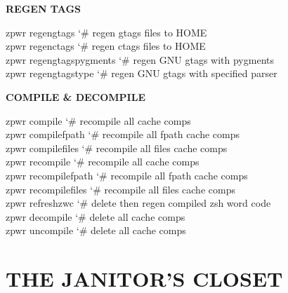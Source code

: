 \documentclass[11pt,a4paper,twoside]{book}
\begin{document}
\vspace{12pt}
{\bfseries\color{neonyellow} REGEN TAGS}\vspace{4pt}

\begin{codebox}
\color{neongreen}zpwr regengtags            {\char`\#} regen gtags files to HOME\\
\color{neongreen}zpwr regenctags            {\char`\#} regen ctags files to HOME\\
\color{neongreen}zpwr regengtagspygments    {\char`\#} regen GNU gtags with pygments\\
\color{neongreen}zpwr regengtagstype        {\char`\#} regen GNU gtags with specified parser\\
\end{codebox}


\vspace{12pt}
{\bfseries\color{neonyellow} COMPILE \& DECOMPILE}\vspace{4pt}

\begin{codebox}
\color{neongreen}zpwr compile               {\char`\#} recompile all cache comps\\
\color{neongreen}zpwr compilefpath          {\char`\#} recompile all fpath cache comps\\
\color{neongreen}zpwr compilefiles          {\char`\#} recompile all files cache comps\\
\color{neongreen}zpwr recompile             {\char`\#} recompile all cache comps\\
\color{neongreen}zpwr recompilefpath        {\char`\#} recompile all fpath cache comps\\
\color{neongreen}zpwr recompilefiles        {\char`\#} recompile all files cache comps\\
\color{neongreen}zpwr refreshzwc            {\char`\#} delete then regen compiled zsh word code\\
\color{neongreen}zpwr decompile             {\char`\#} delete all cache comps\\
\color{neongreen}zpwr uncompile             {\char`\#} delete all cache comps\\
\end{codebox}


\vspace{16pt}


\chapter{THE JANITOR'S CLOSET}
\end{document}
